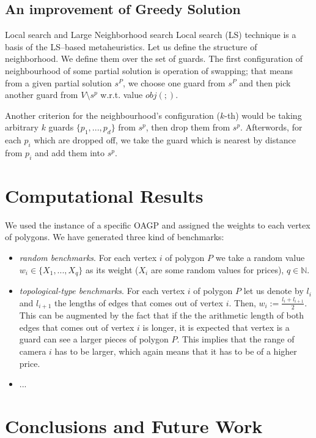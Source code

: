 \documentclass[runningheads,a4paper]{llncs}
\begin{document}
      \subsection{An improvement of Greedy Solution}
      Local search and Large Neighborhood search 
      Local search (LS) technique is a basis of the LS--based metaheuristics. Let us define the structure of neighborhood. We define them over the set of guards. 
      The first configuration of neighbourhood of some partial solution is operation of swapping; that means from a given partial solution $s^P$, we choose one guard from $s^P$ and then pick another guard from $V \setminus s^p$ w.r.t. value $obj(;)$.
      
      Another criterion for the neighbourhood's configuration ($k$-th) would be taking arbitrary $k$ guards $\{p_1,...,p_d\}$ from $s^p$, then drop them from $s^p$. Afterwords, for each $p_i$ which are dropped off, we take the guard which is nearest by distance from $p_i$ and add them into $s^p$. 
     \section{Computational Results}
       We used the instance of a specific OAGP and assigned the weights to each vertex of polygons. We have generated three kind of benchmarks:
       \begin{itemize}
       	  \item \emph{random benchmarks}. For each vertex $i$ of polygon $P$ we take a random value $w_i \in \{X_1,...,X_q\}$  as its weight ($X_i$ are some random values for prices), $q \in \mathbb{N}$. 
       	  \item \emph{topological-type benchmarks}. For each vertex $i$ of polygon $P$ let us denote by $l_i$ and $l_{i+1}$ the lengths of edges that comes out of vertex $i$. Then, $w_i := \frac{l_i + l_{i+1}}{2}$. This can be augmented by the fact that if the the arithmetic length of both edges that comes out of vertex $i$ is longer, it is expected that vertex is a guard can see a larger pieces of polygon $P$. This implies that the range of camera $i$ has to be larger, which again means that it has to be of a higher price. 
       	  \item    ...
       \end{itemize}
     \section{Conclusions and Future Work}
     
     
  
    
    
\end{document}
